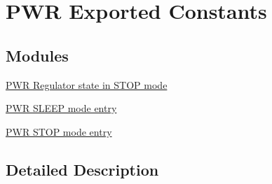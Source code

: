 \hypertarget{group___p_w_r___exported___constants}{}\section{P\+WR Exported Constants}
\label{group___p_w_r___exported___constants}
\subsection*{Modules}
\begin{DoxyCompactItemize}
\item 
\hyperlink{group___p_w_r___regulator__state__in___s_t_o_p__mode}{P\+W\+R Regulator state in S\+T\+O\+P mode}
\item 
\hyperlink{group___p_w_r___s_l_e_e_p__mode__entry}{P\+W\+R S\+L\+E\+E\+P mode entry}
\item 
\hyperlink{group___p_w_r___s_t_o_p__mode__entry}{P\+W\+R S\+T\+O\+P mode entry}
\end{DoxyCompactItemize}


\subsection{Detailed Description}
